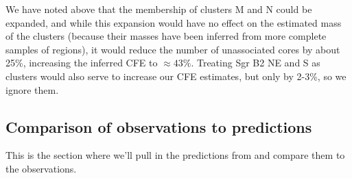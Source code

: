 \documentclass[twocolumn]{aastex61}
\begin{document}
We have noted above that the membership of clusters M and N could be expanded,
and while this expansion would have no effect on the estimated mass of the clusters
(because their masses have been inferred from more complete samples of \hii regions),
it would reduce the number of unassociated cores by about 25\%, increasing the inferred
CFE to $\approx43\%$. %
Treating Sgr B2 NE and S as clusters would also serve to increase our CFE estimates,
but only by 2-3\%, so we ignore them.

\subsection{Comparison of observations to predictions}
{\color{red} This is the section where we'll pull in the predictions from 
\citet{Kruijssen2012a} and compare them to the observations.}





\end{document}
